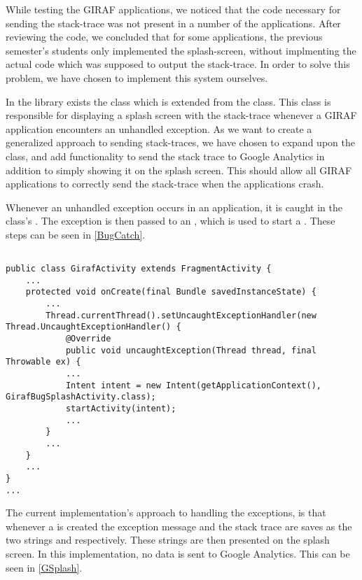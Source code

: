 
While testing the GIRAF applications, we noticed that the code necessary for
sending the stack-trace was not present in a number of the applications. After
reviewing the code, we concluded that for some applications, the previous
semester's students only implemented the splash-screen, without implmenting the
actual code which was supposed to output the stack-trace. In order to solve this
problem, we have chosen to implement this system ourselves.\nl

In the library  exists the class
 which is extended from the 
class. This class is responsible for displaying a splash screen with the
stack-trace whenever a GIRAF application encounters an unhandled exception. As
we want to create a generalized approach to sending stack-traces, we have chosen
to expand upon the  class, and add functionality
to send the stack trace to Google Analytics in addition to simply showing it on
the splash screen. This should allow all GIRAF applications to correctly send
the stack-trace when the applications crash. \nl

Whenever an unhandled exception occurs in an application, it is caught in the
 class's . The exception is
then passed to an , which is used to start a
. These steps can be seen in
\autoref{BugCatch}.\nl


\begin{minipage}[H]{\linewidth}
\begin{lstlisting}[caption = Catching exceptions and starting creating a \textc{GirafBugSplashActivity}, label = BugCatch]

public class GirafActivity extends FragmentActivity {
	...
    protected void onCreate(final Bundle savedInstanceState) {
    	...
    	Thread.currentThread().setUncaughtExceptionHandler(new Thread.UncaughtExceptionHandler() {
            @Override
            public void uncaughtException(Thread thread, final Throwable ex) {
            ...
            Intent intent = new Intent(getApplicationContext(), GirafBugSplashActivity.class);
			startActivity(intent);
			...
		}
		...
	}
	...
}
...			
\end{lstlisting}
\end{minipage}

The current implementation's approach to handling the exceptions, is
that whenever a  is created the exception message
and the stack trace are saves as the two strings  and
 respectively. These strings are then presented on the splash
screen. In this implementation, no data is sent to Google Analytics. This can be
seen in \autoref{GSplash}.\nl


